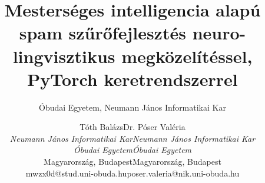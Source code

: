 \documentclass[lettersize,journal]{IEEEtran}
\begin{document}
\title{Mesterséges intelligencia alapú spam szűrőfejlesztés neuro-lingvisztikus megközelítéssel, PyTorch keretrendszerrel}
\author{Óbudai Egyetem, Neumann János Informatikai Kar}


\author{%
  \begin{tabular}{ccc}
      \small{Tóth Balázs} & \small{Dr. Póser Valéria} \\
      \small{\it{Neumann János Informatikai Kar}} & \small{\it{Neumann János Informatikai Kar}} \\
      \small{\it{Óbudai Egyetem}} & \small{\it{Óbudai Egyetem}} \\
      \small{Magyarország, Budapest}  & \small{Magyarország, Budapest} \\
      \small{mwzx0d@stud.uni-obuda.hu}  & \small{poser.valeria@nik.uni-obuda.hu}
  \end{tabular}
}

\maketitle







\end{document}
